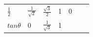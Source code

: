 {\begin{tabular}[t]{|l|l|l|l|l|l|l|}
                \begin{math}\frac{1}{2}\end{math}
               &
                \begin{math}\frac{1}{\sqrt{2}}\end{math}
               &
                \begin{math}\frac{\sqrt{3}}{2}\end{math}
               &
        1 &
        0%
     \tabularnewline\cline{1-1}\cline{2-2}\cline{3-3}\cline{4-4}\cline{5-5}\cline{6-6}\cline{7-7}
                \begin{math}tan\theta \end{math}
               &
        0 &
                \begin{math}\frac{1}{\sqrt{3}}\end{math}
               &
        1 &

\end{tabular}}
